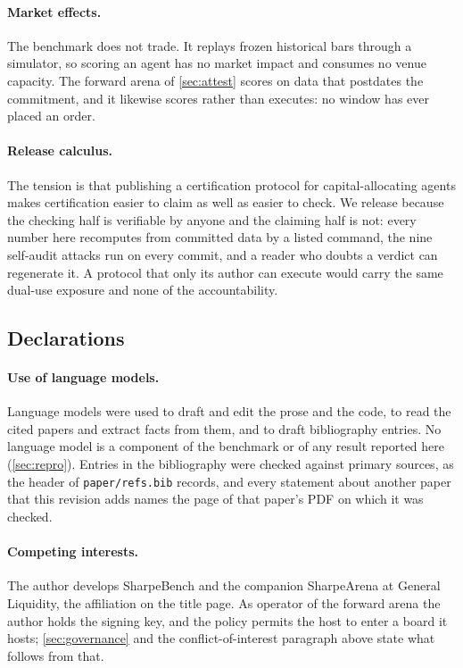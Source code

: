 \paragraph{Market effects.} The benchmark does not trade. It replays frozen historical bars through a simulator, so scoring an agent has no market impact and consumes no venue capacity. The forward arena of \cref{sec:attest} scores on data that postdates the commitment, and it likewise scores rather than executes: no window has ever placed an order.

\paragraph{Release calculus.} The tension is that publishing a certification protocol for capital-allocating agents makes certification easier to claim as well as easier to check. We release because the checking half is verifiable by anyone and the claiming half is not: every number here recomputes from committed data by a listed command, the nine self-audit attacks run on every commit, and a reader who doubts a verdict can regenerate it. A protocol that only its author can execute would carry the same dual-use exposure and none of the accountability.

\subsection*{Declarations}

\paragraph{Use of language models.} Language models were used to draft and edit the prose and the code, to read the cited papers and extract facts from them, and to draft bibliography entries. No language model is a component of the benchmark or of any result reported here (\cref{sec:repro}). Entries in the bibliography were checked against primary sources, as the header of \texttt{paper/refs.bib} records, and every statement about another paper that this revision adds names the page of that paper's PDF on which it was checked.

\paragraph{Competing interests.} The author develops SharpeBench and the companion SharpeArena \citep{toca2026sharpearena} at General Liquidity, the affiliation on the title page. As operator of the forward arena the author holds the signing key, and the policy permits the host to enter a board it hosts; \cref{sec:governance} and the conflict-of-interest paragraph above state what follows from that.

